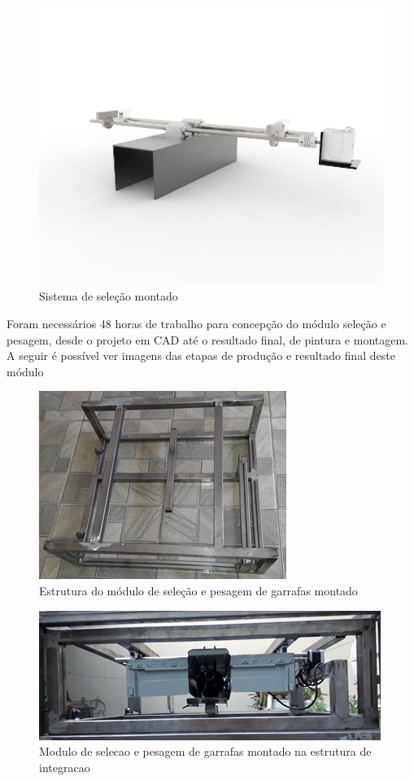 \begin{figure}[!h]
	\centering
		\includegraphics[scale=0.4]{figuras/estrutura/9-Sistema-de-selecao-montado.jpg}
	\caption{Sistema de seleção montado}
\end{figure}

Foram necessários 48 horas de trabalho para concepção do módulo seleção e pesagem, desde o projeto em CAD até o resultado final, de pintura e montagem. A seguir é possível ver imagens das etapas de produção e resultado final deste módulo

\begin{figure}[!h]
	\centering
		\includegraphics[scale=1.1]{figuras/estrutura/10-Estrutura-do-modulo-de-selecao-e-pesagem-de-garrafas-montado.png}
	\caption{Estrutura do módulo de seleção e pesagem de garrafas montado}
\end{figure}

\begin{figure}[!h]
	\centering
		\includegraphics[scale=0.8]{figuras/estrutura/11.png}
	\caption{Modulo de selecao e pesagem de garrafas montado na estrutura de integracao}
\end{figure}

